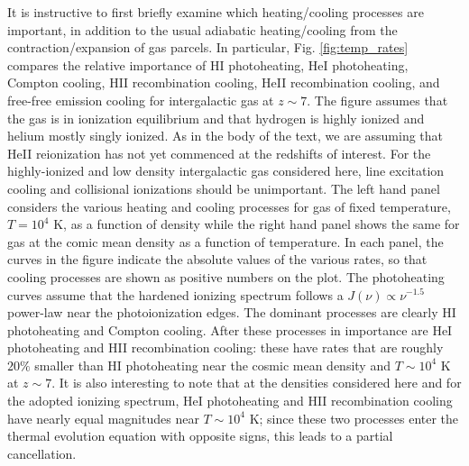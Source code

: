 It is instructive to first briefly examine which heating/cooling processes are important, in addition to the usual 
adiabatic heating/cooling from the contraction/expansion of gas parcels. In particular, Fig. \ref{fig:temp_rates} compares the relative importance of HI photoheating, HeI photoheating, Compton cooling,
HII recombination cooling, HeII recombination cooling, and free-free emission cooling for intergalactic gas at $z \sim 7$.
The figure assumes that the gas is in ionization equilibrium and that hydrogen is highly ionized and helium mostly singly
ionized. As in the body of the text, we are assuming that HeII reionization has not yet commenced at the redshifts of interest.
For the highly-ionized and low density intergalactic gas considered here, line excitation cooling and collisional ionizations should be unimportant.
The left hand panel considers the various heating and cooling processes for gas of fixed temperature, 
$T = 10^4$ K, as a function of density while the right hand panel shows the same for gas at the comic mean density as a function of temperature. In each
panel, the curves in the figure indicate the absolute values of the various rates, so that cooling processes are shown as positive numbers on the plot.
The photoheating
curves assume that the hardened ionizing spectrum follows a $J(\nu) \propto \nu^{-1.5}$ power-law near the photoionization 
edges.
The dominant processes are clearly HI photoheating and Compton cooling. After these processes in importance are
HeI photoheating and HII recombination cooling: these have rates that are roughly $20\%$ smaller than HI photoheating near the
cosmic mean density and $T \sim 10^4$ K at $z \sim 7$. It is also interesting to note that at the densities considered here and for
the adopted ionizing spectrum, HeI photoheating and HII recombination cooling have nearly equal magnitudes near $T \sim 10^4$ K;
since these two processes enter the thermal evolution equation with opposite signs, this leads to a partial cancellation.

